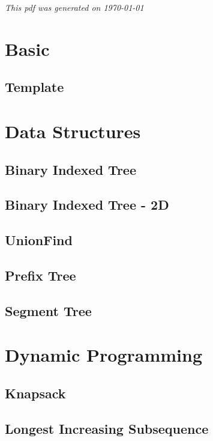 \documentclass[10pt]{article}
\begin{document}
	\tableofcontents
	\vfill
	\textit{This pdf was generated on \today}
	\newpage
	
	\section{Basic}
		\subsection{Template}
				
		
	\newpage
	\section{Data Structures}
		\subsection{Binary Indexed Tree}
		
		
		\subsection{Binary Indexed Tree - 2D}
		
		
		\subsection{UnionFind}
		
		
		\subsection{Prefix Tree}
		
		
		\newpage
		\subsection{Segment Tree}
		
		\newpage
		
	\section{Dynamic Programming}
		\subsection{Knapsack}
		
		
		\subsection{Longest Increasing Subsequence}
		
		
\end{document}
